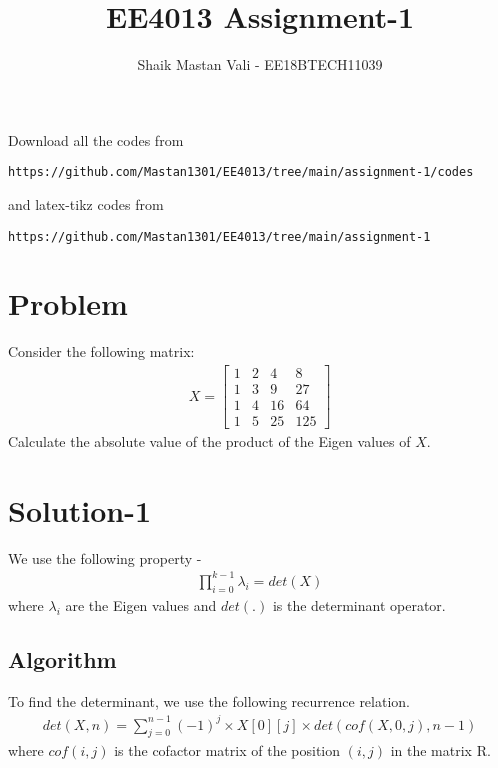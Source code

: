 \documentclass[journal,12pt,twocolumn]{IEEEtran}
\begin{document}
     \def\rightbox#1{\makebox[0in][r]{#1}}
     \def\centbox#1{\makebox[0in]{#1}}
     \def\topbox#1{\raisebox{-\baselineskip}[0in][0in]{#1}}
     \def\midbox#1{\raisebox{-0.5\baselineskip}[0in][0in]{#1}}
\vspace{3cm}
\title{EE4013 Assignment-1}
\author{Shaik Mastan Vali - EE18BTECH11039}
\maketitle
\newpage
\bigskip
\renewcommand{\thefigure}{\theenumi}
\renewcommand{\thetable}{\theenumi}
Download all the codes from 
\begin{lstlisting}
https://github.com/Mastan1301/EE4013/tree/main/assignment-1/codes
\end{lstlisting}
%
and latex-tikz codes from 
%
\begin{lstlisting}
https://github.com/Mastan1301/EE4013/tree/main/assignment-1
\end{lstlisting}

\section{Problem}
Consider the following matrix:
\begin{align*}
    X = \begin{bmatrix}
        1 & 2 & 4 & 8 \\
        1 & 3 & 9 & 27 \\
        1 & 4 & 16 & 64 \\
        1 & 5 & 25 & 125
    \end{bmatrix}
\end{align*}
Calculate the absolute value of the product of the Eigen values of $X$.

\section{\textbf{Solution-1}}
We use the following property -
\begin{align*}
    \prod_{i = 0}^{k - 1} \lambda_{i} = det(X)
\end{align*}
where $\lambda_{i}$ are the Eigen values and $det(.)$ is the determinant operator. 
\subsection{Algorithm}
To find the determinant, we use the following recurrence relation.
\begin{align*}
    det(X, n) = \sum_{j = 0}^{n - 1} (-1) ^ {j} \times X[0][j] \times det(cof(X, 0, j), n - 1)
\end{align*}
where $cof(i, j)$ is the cofactor matrix of the position $(i, j)$ in the matrix R. \\ \\
\end{document}
